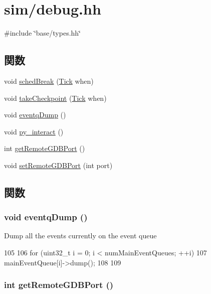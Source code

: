 \hypertarget{sim_2debug_8hh}{
\section{sim/debug.hh}
\label{sim_2debug_8hh}
}
{\ttfamily \#include \char`\"{}base/types.hh\char`\"{}}\par
\subsection*{関数}
\begin{DoxyCompactItemize}
\item 
void \hyperlink{sim_2debug_8hh_a4c79c8ce91cdbeb5e36a2f9ec71f4e73}{schedBreak} (\hyperlink{base_2types_8hh_a5c8ed81b7d238c9083e1037ba6d61643}{Tick} when)
\item 
void \hyperlink{sim_2debug_8hh_a8e601d5e7c5df79b432e340f3af19583}{takeCheckpoint} (\hyperlink{base_2types_8hh_a5c8ed81b7d238c9083e1037ba6d61643}{Tick} when)
\item 
void \hyperlink{sim_2debug_8hh_abce4c2f3b43451b7267d9e1e0b2ec153}{eventqDump} ()
\item 
void \hyperlink{sim_2debug_8hh_a11045488b3a5d8e441765810c10272eb}{py\_\-interact} ()
\item 
int \hyperlink{sim_2debug_8hh_ada8b15a8637de4d4f29e366c6e1acf51}{getRemoteGDBPort} ()
\item 
void \hyperlink{sim_2debug_8hh_a6ff050ba197ef015254b723272affd53}{setRemoteGDBPort} (int port)
\end{DoxyCompactItemize}


\subsection{関数}
\hypertarget{sim_2debug_8hh_abce4c2f3b43451b7267d9e1e0b2ec153}{
\subsubsection[{eventqDump}]{\setlength{\rightskip}{0pt plus 5cm}void eventqDump ()}}
\label{sim_2debug_8hh_abce4c2f3b43451b7267d9e1e0b2ec153}
Dump all the events currently on the event queue 


\begin{DoxyCode}
105 {
106     for (uint32_t i = 0; i < numMainEventQueues; ++i) {
107         mainEventQueue[i]->dump();
108     }
109 }
\end{DoxyCode}
\hypertarget{sim_2debug_8hh_ada8b15a8637de4d4f29e366c6e1acf51}{
\subsubsection[{getRemoteGDBPort}]{\setlength{\rightskip}{0pt plus 5cm}int getRemoteGDBPort ()}}
\label{sim_2debug_8hh_ada8b15a8637de4d4f29e366c6e1acf51}



